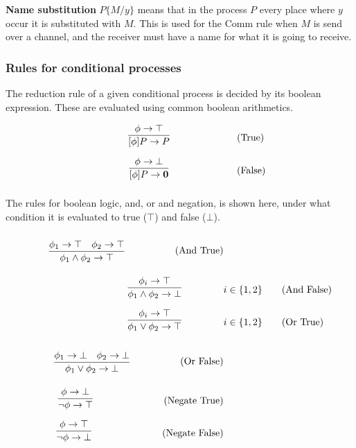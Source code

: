\textbf{Name substitution} \ensuremath{P\{M/y\}} means that in the process \ensuremath{P} every place where \ensuremath{y} occur it is substituted with \ensuremath{M}. This is used for the Comm rule when \ensuremath{M} is send over a channel, and the receiver must have a name for what it is going to receive.
\FloatBarrier

\subsubsection{Rules for conditional processes}
The reduction rule of a given conditional process is decided by its boolean expression. These are evaluated using common boolean arithmetics.

\begin{align}
	& \infrule{\phi \ra \top}{[\phi]P\ra P} \tag{True}\\
	& \infrule{\phi \ra \bot}{[\phi]P\ra \nil} \tag{False}
\end{align}

The rules for boolean logic, and, or and negation, is shown here, under what condition it is evaluated to true (\ensuremath{\top}) and false (\ensuremath{\bot}).
\begin{align*}
\infrule{\phi_1 \ra \top \quad \phi_2 \ra \top}{\phi_1 \wedge \phi_2 \ra \top}\tag{And True}\\
\infrule{\phi_i \ra \top}{\phi_1 \wedge \phi_2 \ra \bot} &i\in \{1,2\}\tag{And False}\\
\infrule{\phi_i \ra \top}{\phi_1 \vee \phi_2 \ra \top} &i\in \{1,2\} \tag{Or True}\\
\infrule{\phi_1 \ra \bot \quad \phi_2 \ra \bot}{\phi_1 \vee \phi_2 \ra \bot} \tag{Or False}\\
\infrule{\phi \ra \bot}{\neg\phi \ra \top} \tag{Negate True}\\
\infrule{\phi \ra \top}{\neg\phi \ra \bot} \tag{Negate False}\\
\end{align*}

